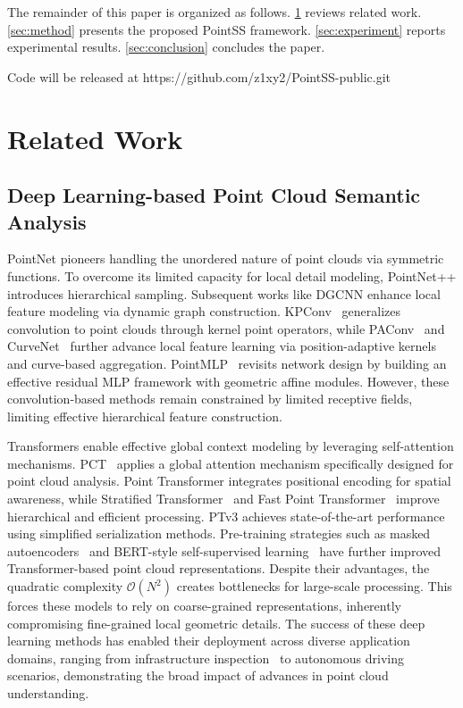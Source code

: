 \documentclass[a4paper,fleqn]{cas-sc}
\begin{document}
The remainder of this paper is organized as follows. \cref{sec:related} reviews related work. \cref{sec:method} presents the proposed PointSS framework. \cref{sec:experiment} reports experimental results. \cref{sec:conclusion} concludes the paper.

Code will be released at https://github.com/z1xy2/PointSS-public.git


\section{Related Work}\label{sec:related}
\subsection{Deep Learning-based Point Cloud Semantic Analysis}
PointNet \cite{pointnet} pioneers handling the unordered nature of point clouds via symmetric functions. To overcome its limited capacity for local detail modeling, PointNet++ \cite{PointNet++} introduces hierarchical sampling. Subsequent works like DGCNN \cite{DGCNN} enhance local feature modeling via dynamic graph construction. KPConv~\cite{KPConv} generalizes convolution to point clouds through kernel point operators, while PAConv~\cite{paconv} and CurveNet~\cite{curvenet} further advance local feature learning via position-adaptive kernels and curve-based aggregation. PointMLP~\cite{pointmlp} revisits network design by building an effective residual MLP framework with geometric affine modules. However, these convolution-based methods remain constrained by limited receptive fields, limiting effective hierarchical feature construction.

Transformers enable effective global context modeling by leveraging self-attention mechanisms. PCT~\cite{PCT} applies a global attention mechanism specifically designed for point cloud analysis. Point Transformer \cite{pt} integrates positional encoding for spatial awareness, while Stratified Transformer~\cite{stratified_transformer} and Fast Point Transformer~\cite{fast_point_transformer} improve hierarchical and efficient processing. PTv3 \cite{ptv3} achieves state-of-the-art performance using simplified serialization methods. Pre-training strategies such as masked autoencoders~\cite{pointmae} and BERT-style self-supervised learning~\cite{Point-BERT} have further improved Transformer-based point cloud representations. Despite their advantages, the quadratic complexity $\mathcal{O}(N^2)$ creates bottlenecks for large-scale processing. This forces these models to rely on coarse-grained representations, inherently compromising fine-grained local geometric details. The success of these deep learning methods has enabled their deployment across diverse application domains, ranging from infrastructure inspection~\cite{bridgePointCloud} to autonomous driving scenarios, demonstrating the broad impact of advances in point cloud understanding.
\end{document}
